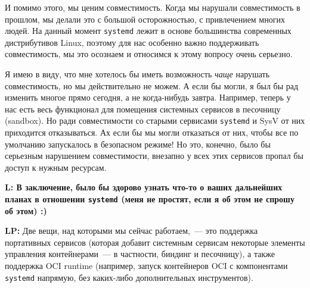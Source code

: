\documentclass[10pt, a5paper]{article}
\begin{document}
\begin{Parallel}[p]{}{}
{И помимо этого, мы ценим совместимость. Когда мы нарушали совместимость в прошлом, мы делали это с большой осторожностью, с привлечением многих людей. На данный момент \verb!systemd! лежит в основе большинства современных дистрибутивов Linux, поэтому для нас особенно важно поддерживать совместимость, мы это осознаем и относимся к этому вопросу очень серьезно.
                      
Я имею в виду, что мне хотелось бы иметь возможность \textit{чаще} нарушать совместимость, но мы действительно не можем. А если бы могли, я был бы рад изменить многое прямо сегодня, а не когда-нибудь завтра. Например, теперь у нас есть весь функционал для помещения системных сервисов в песочницу (sandbox). Но ради совместимости со старыми сервисами \verb!systemd! и SysV от них приходится отказываться. Ах если бы мы могли отказаться от них, чтобы все по умолчанию запускалось в безопасном режиме! Но это, конечно, было бы серьезным нарушением совместимости, внезапно у всех этих сервисов пропал бы доступ к нужным ресурсам.

{\noindent \bf L: В заключение, было бы здорово узнать что-то о ваших дальнейших планах в отношении \verb!systemd! (меня не простят, если я об этом не спрошу об этом) :)}

{\noindent \bf LP:} Две вещи, над которыми мы сейчас работаем,~--- это поддержка портативных сервисов (которая добавит системным сервисам некоторые элементы управления контейнерами~--- в частности, биндинг и песочницу), а также поддержка OCI runtime (например, запуск контейнеров OCI с компонентами \verb!systemd! напрямую, без каких-либо дополнительных инструментов).


\vfill

     }
   \end{Parallel}

 
\end{document}
